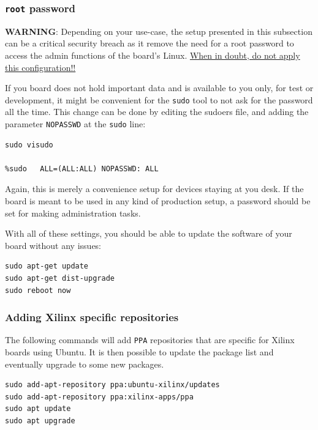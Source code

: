\documentclass[10pt]{article}
\begin{document}
\subsubsection{\texttt{root} password}
\label{sec:orge90928c}
\begin{tcolorbox}[colback=orange!5!white,colframe=orange!75!black]
\textbf{WARNING}: Depending on your use-case, the setup presented in this
subsection can be a critical security breach as it remove the need for a root
password to access the admin functions of the board's Linux.
\uline{When in doubt, do not apply this configuration!!}
\end{tcolorbox}

If you board does not hold important data
and is available to you only, for test or development,
it might be convenient for the \texttt{sudo} tool to not ask for the
password all the time.
This change can be done by editing the sudoers file, and
adding the parameter \texttt{NOPASSWD}
at the \texttt{sudo} line:

\begin{verbatim}
sudo visudo

%sudo   ALL=(ALL:ALL) NOPASSWD: ALL
\end{verbatim}

Again, this is merely a convenience setup for devices staying at you desk. If
the board is meant to be used in any kind of production setup, a password
should be set for making administration tasks.

With all of these settings, you should be able to update the software of your
board without any issues:
\begin{verbatim}
sudo apt-get update
sudo apt-get dist-upgrade
sudo reboot now
\end{verbatim}

\subsubsection{Adding Xilinx specific repositories}
\label{sec:orge7b17c6}
The following commands will add \texttt{PPA} repositories that are specific for Xilinx boards using Ubuntu.
It is then possible to update the package list and eventually upgrade to some new packages.
\begin{verbatim}
sudo add-apt-repository ppa:ubuntu-xilinx/updates
sudo add-apt-repository ppa:xilinx-apps/ppa
sudo apt update
sudo apt upgrade
\end{verbatim}
\end{document}
